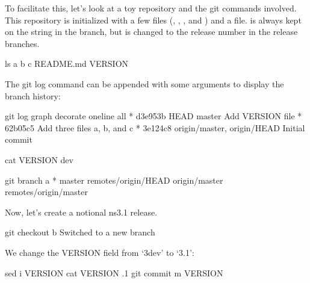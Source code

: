 \documentclass[letterpaper,10pt,english]{sphinxmanual}
\renewcommand{\sphinxcode}[1]{\texttt{\small{#1}}}
\begin{document}
To facilitate this, let’s look at a toy repository and the git commands
involved.  This repository is initialized with a few files (\sphinxcode{}, \sphinxcode{},
\sphinxcode{}, and \sphinxcode{}) and a \sphinxcode{} file.  \sphinxcode{\sphinxupquote{VERSION}} is always
kept on the string \sphinxcode{} in the \sphinxcode{} branch, but is changed to
the release number in the release branches.

\begin{sphinxVerbatim}[commandchars=\\\{\}]
\PYGZdl{} ls
a  b  c  README.md  VERSION
\end{sphinxVerbatim}

The git log command can be appended with some arguments to display the
branch history:

\begin{sphinxVerbatim}[commandchars=\\\{\}]
\PYGZdl{} git log \PYGZhy{}\PYGZhy{}graph \PYGZhy{}\PYGZhy{}decorate \PYGZhy{}\PYGZhy{}oneline \PYGZhy{}\PYGZhy{}all
* d3e953b HEAD \PYGZhy{}\PYGZgt{} master Add VERSION file
* 62b05c5 Add three files a, b, and c
* 3e124c8 origin/master, origin/HEAD Initial commit

\PYGZdl{} cat VERSION
\PYGZhy{}dev

\PYGZdl{} git branch \PYGZhy{}a
* master
  remotes/origin/HEAD \PYGZhy{}\PYGZgt{} origin/master
  remotes/origin/master
\end{sphinxVerbatim}

Now, let’s create a notional ns\sphinxhyphen{}3.1 release.

\begin{sphinxVerbatim}[commandchars=\\\{\}]
\PYGZdl{} git checkout \PYGZhy{}b 
Switched to a new branch 
\end{sphinxVerbatim}

We change the VERSION field from ‘3\sphinxhyphen{}dev’ to ‘3.1’:

\begin{sphinxVerbatim}[commandchars=\\\{\}]
\PYGZdl{} sed \PYGZhy{}i  VERSION
\PYGZdl{} cat VERSION
.1
\PYGZdl{} git commit \PYGZhy{}m VERSION
\end{sphinxVerbatim}
\end{document}
